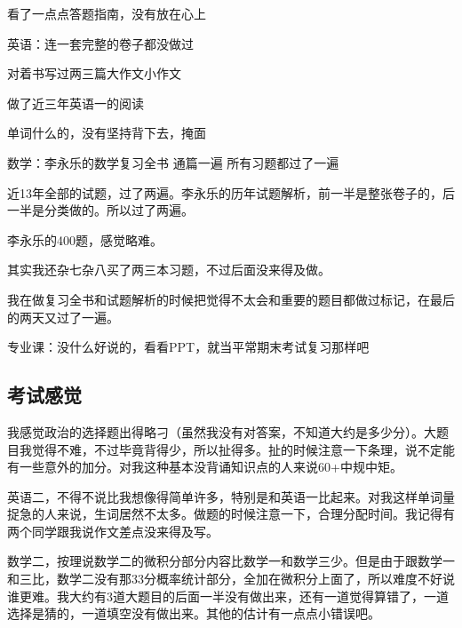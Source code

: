 看了一点点答题指南，没有放在心上\par

 

英语：连一套完整的卷子都没做过\par

      对着书写过两三篇大作文小作文\par

      做了近三年英语一的阅读\par

      单词什么的，没有坚持背下去，掩面\par

 

数学：李永乐的数学复习全书 通篇一遍 所有习题都过了一遍\par

      近13年全部的试题，过了两遍。李永乐的历年试题解析，前一半是整张卷子的，后一半是分类做的。所以过了两遍。\par

      李永乐的400题，感觉略难。\par

      其实我还杂七杂八买了两三本习题，不过后面没来得及做。\par

      我在做复习全书和试题解析的时候把觉得不太会和重要的题目都做过标记，在最后的两天又过了一遍。\par

 

专业课：没什么好说的，看看PPT，就当平常期末考试复习那样吧

 

\subsection{考试感觉}

我感觉政治的选择题出得略刁（虽然我没有对答案，不知道大约是多少分）。大题目我觉得不难，不过毕竟背得少，所以扯得多。扯的时候注意一下条理，说不定能有一些意外的加分。对我这种基本没背诵知识点的人来说60+中规中矩。\par

英语二，不得不说比我想像得简单许多，特别是和英语一比起来。对我这样单词量捉急的人来说，生词居然不太多。做题的时候注意一下，合理分配时间。我记得有两个同学跟我说作文差点没来得及写。\par

数学二，按理说数学二的微积分部分内容比数学一和数学三少。但是由于跟数学一和三比，数学二没有那33分概率统计部分，全加在微积分上面了，所以难度不好说谁更难。我大约有3道大题目的后面一半没有做出来，还有一道觉得算错了，一道选择是猜的，一道填空没有做出来。其他的估计有一点点小错误吧。\par

